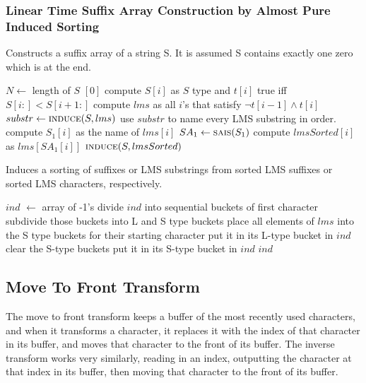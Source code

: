 \documentclass[a4paper]{article}
\newcommand{\AND}{\wedge}
\newcommand{\NOT}{\neg}
\begin{document}
\begin{multicols}{2}
\subsubsection{Linear Time Suffix Array Construction by Almost Pure Induced Sorting}
\begin{algorithm}[H]
\caption{Constructs a suffix array of a string S. It is assumed S contains exactly one zero which is at the end.}
\begin{algorithmic}[1]
\State $N \gets $ length of $S$
\State \Return $[0]$
\EndIf
\State compute $S[i]$ as $S$ type and $t[i]$ true iff $S[i:] < S[i+1:]$
\State compute $lms$ as all $i$'s that satisfy $\NOT t[i-1] \AND t[i]$
\State $substr \gets \Call{induce}{S, lms}$
\State use $substr$ to name every LMS substring in order.
\State compute $S_1[i]$ as the name of $lms[i]$
\State $SA_1 \gets \Call{sais}{S_1}$
\State compute $lmsSorted[i]$ as $lms[SA_1[i]]$ 
\State \Return $\Call{induce}{S, lmsSorted}$
\EndFunction
\end{algorithmic}
\end{algorithm}
\vspace*{-.8cm}
\begin{algorithm}[H]
\caption{Induces a sorting of suffixes or LMS substrings from sorted LMS suffixes or sorted LMS characters, respectively.}
\begin{algorithmic}[1]
\State $ind$ $\gets$ array of -1's
\State divide $ind$ into sequential buckets of first character
\State subdivide those buckets into L and S type buckets
\State place all elements of $lms$ into the S type buckets for their starting character
\State put it in its L-type bucket in $ind$
\EndIf
\EndFor
\State clear the S-type buckets
\State put it in its S-type bucket in $ind$
\EndIf
\EndFor
\State \Return $ind$
\EndFunction
\end{algorithmic}
\end{algorithm}
\subsection{Move To Front Transform}
The move to front transform \cite{Bentley:1986:LAD:5684.5688} keeps a buffer of the most recently used characters, and when it transforms a character, it replaces it with the index of that character in its buffer, and moves that character to the front of its buffer. The inverse transform works very similarly, reading in an index, outputting the character at that index in its buffer, then moving that character to the front of its buffer.


\end{multicols}
\end{document}
